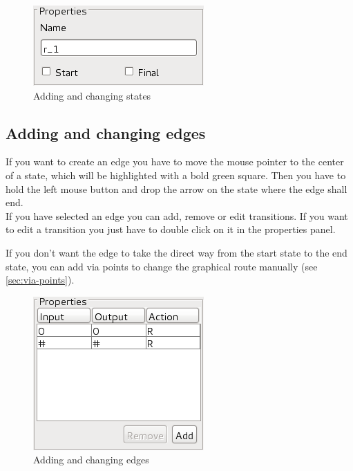 \documentclass[%
  a4paper,%
  11pt,%
  blue,%
  hyperref	%
  ]{tubsartcl}
\begin{document}
\begin{figure}[!htb]
\begin{center}
\includegraphics[scale=0.5]{graphics_gui/state_properties.png}
\end{center}
\caption{Adding and changing states}
\label{pic:state_properties}
\end{figure}

\clearpage

\subsection{Adding and changing edges}
\label{sec:adding-chang-edges}
If you want to create an edge you have to move the mouse pointer to the center of a state, which will be highlighted with a bold green square. Then you have to hold the left mouse button and drop the arrow on the state where the edge shall end. \\
If you have selected an edge you can add, remove or edit transitions. If you want to edit a transition you just have to double click on it in the properties panel.

If you don't want the edge to take the direct way from the start state to the end state, you can add via points to change the graphical route manually (see \ref{sec:via-points}).
\begin{figure}[!htb]
\begin{center}
\includegraphics[scale=0.5]{graphics_gui/edge_properties.png}
\end{center}
\caption{Adding and changing edges}
\label{pic:edge_properties}
\end{figure}
\end{document}
